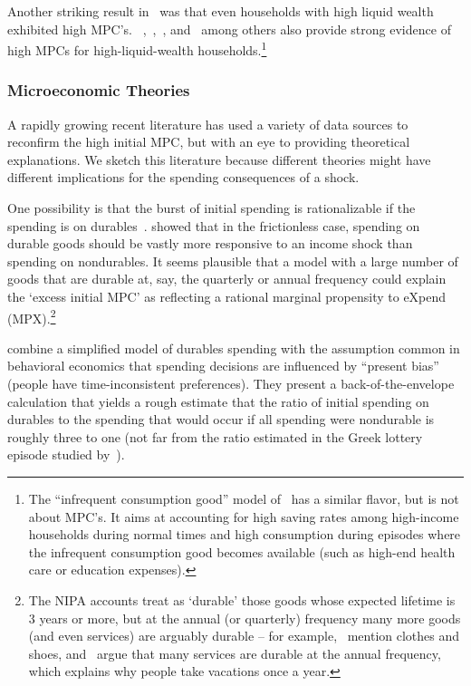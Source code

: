 \documentclass[\latexroot/\projectname]{subfiles}
\begin{document}
Another striking result in~\cite{fagereng-mpc-2021} was that even households with high liquid wealth exhibited high MPC's. ~\cite{boehm2025fivefacts},~\cite{graham2024mental},~\cite{crawley2023MicroMacro}, and~\cite{kueng2018excess} among others also provide strong evidence of high MPCs for high-liquid-wealth households.\footnote{The ``infrequent consumption good'' model of~\cite{melcangiStock} has a similar flavor, but is not about MPC's.  It aims at accounting for high saving rates among high-income households during normal times and high consumption during episodes where the infrequent consumption good becomes available (such as high-end health care or education expenses).}

\whenintegrated{\label{microeconomic-theories}}
\subsubsection{Microeconomic Theories}
A rapidly growing recent literature has used a variety of data sources to reconfirm the high initial MPC, but with an eye to providing theoretical explanations. We sketch this literature because different theories might have different implications for the spending consequences of a shock.

One possibility is that the burst of initial spending is rationalizable if the spending is on durables~\citep{bcShocksStocks}.
\cite{mankiwDurgoods} showed that in the frictionless case, spending on durable goods should be vastly more responsive to an income shock than spending on nondurables.
It seems plausible that a model with a large number of goods that are durable at, say, the quarterly or annual frequency could explain the `excess initial MPC' as reflecting a rational marginal propensity to eXpend (MPX).\footnote{The NIPA accounts treat as `durable' those goods whose expected lifetime is 3 years or more, but at the annual (or quarterly) frequency many more goods (and even services) are arguably durable -- for example,~\cite{bdTimeSeriesC} mention clothes and shoes, and~\cite{hkpMemorable} argue that many services are durable at the annual frequency, which explains why people take vacations once a year.}

\cite{lmmPresentBias} combine a simplified model of durables spending with the assumption common in behavioral economics that spending decisions are influenced by ``present bias'' (people have time-inconsistent preferences).  They present a back-of-the-envelope calculation that yields a rough estimate that the ratio of initial spending on durables to the spending that would occur if all spending were nondurable is roughly three to one (not far from the ratio estimated in the Greek lottery episode studied by~\cite{kotsogiannisMPCs}).
\end{document}

